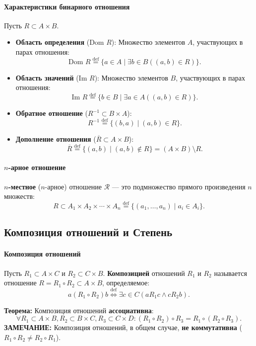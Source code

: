 \paragraph{Характеристики бинарного отношения}
Пусть $R \subset A \times B$.
\begin{itemize}
    \item \textbf{Область определения} ($\text{Dom } R$): Множество элементов $A$, участвующих в парах отношения:
    $$\text{Dom } R \stackrel{\text{def}}{=} \{a \in A \mid \exists b \in B ((a, b) \in R)\}.$$
    \item \textbf{Область значений} ($\text{Im } R$): Множество элементов $B$, участвующих в парах отношения:
    $$\text{Im } R \stackrel{\text{def}}{=} \{b \in B \mid \exists a \in A ((a, b) \in R)\}.$$
    \item \textbf{Обратное отношение} ($R^{-1} \subset B \times A$):
    $$R^{-1} \stackrel{\text{def}}{=} \{(b, a) \mid (a, b) \in R\}.$$
    \item \textbf{Дополнение отношения} ($\overline{R} \subset A \times B$):
    $$\overline{R} \stackrel{\text{def}}{=} \{(a, b) \mid (a, b) \notin R\} = (A \times B) \setminus R.$$
\end{itemize}

\paragraph{$n$-арное отношение}
\textbf{$n$-местное} ($n$-арное) отношение $\mathcal{R}$ --- это подмножество прямого произведения $n$ множеств:
$$R \subset A_1 \times A_2 \times \cdots \times A_n \stackrel{\text{def}}{=} \{(a_1, \ldots, a_n) \mid a_i \in A_i\}.$$

\subsection*{Композиция отношений и Степень}

\paragraph{Композиция отношений}
Пусть $R_1 \subset A \times C$ и $R_2 \subset C \times B$. \textbf{Композицией} отношений $R_1$ и $R_2$ называется отношение $R = R_1 \circ R_2 \subset A \times B$, определяемое:
$$a (R_1 \circ R_2) b \stackrel{\text{def}}{\iff} \exists c \in C (a R_1 c \land c R_2 b).$$

\textbf{Теорема:} Композиция отношений \textbf{ассоциативна}:
$$\forall R_1 \subset A \times B, R_2 \subset B \times C, R_3 \subset C \times D: (R_1 \circ R_2) \circ R_3 = R_1 \circ (R_2 \circ R_3).$$
\textbf{ЗАМЕЧАНИЕ:} Композиция отношений, в общем случае, \textbf{не коммутативна} ($R_1 \circ R_2 \ne R_2 \circ R_1$).

